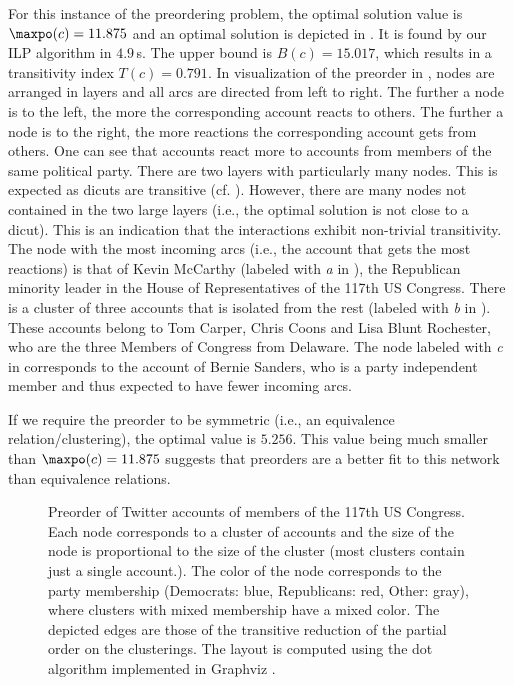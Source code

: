 For this instance of the preordering problem, the optimal solution value is $\maxpo(c) = 11.875$ and an optimal solution is depicted in .
It is found by our ILP algorithm in $4.9\,$s.
The upper bound is $B(c) = 15.017$, which results in a transitivity index $T(c) = 0.791$.
In visualization of the preorder in , nodes are arranged in layers and all arcs are directed from left to right. 
The further a node is to the left, the more the corresponding account reacts to others. 
The further a node is to the right, the more reactions the corresponding account gets from others.
One can see that accounts react more to accounts from members of the same political party.
There are two layers with particularly many nodes. 
This is expected as dicuts are transitive (cf. ).
However, there are many nodes not contained in the two large layers (i.e., the optimal solution is not close to a dicut).
This is an indication that the interactions exhibit non-trivial transitivity.
The node with the most incoming arcs (i.e., the account that gets the most reactions) is that of Kevin McCarthy (labeled with \textit{a} in ), the Republican minority leader in the House of Representatives of the 117th US Congress.
There is a cluster of three accounts that is isolated from the rest (labeled with \textit{b} in ). 
These accounts belong to Tom Carper, Chris Coons and Lisa Blunt Rochester, who are the three Members of Congress from Delaware.
The node labeled with \textit{c} in  corresponds to the account of Bernie Sanders, who is a party independent member and thus expected to have fewer incoming arcs.

If we require the preorder to be symmetric (i.e., an equivalence relation/clustering), the optimal value is $5.256$.
This value being much smaller than $\maxpo(c) = 11.875$ suggests that preorders are a better fit to this network than equivalence relations.

\begin{figure}
    \centering
    
    \caption{Preorder of Twitter accounts of members of the 117th US Congress.
    Each node corresponds to a cluster of accounts and the size of the node is proportional to the size of the cluster (most clusters contain just a single account.). 
    The color of the node corresponds to the party membership (Democrats: blue, Republicans: red, Other: gray), where clusters with mixed membership have a mixed color.
    The depicted edges are those of the transitive reduction of the partial order on the clusterings.
    The layout is computed using the dot algorithm implemented in Graphviz \citep{ellson2004graphviz}.}
    \label{fig:congress-preorder}
\end{figure}

